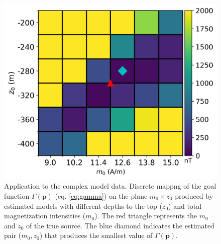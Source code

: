 \begin{figure}
	\centering
	\includegraphics[scale=.75]{figures/complex_gamma.png}
	\caption{Application to the complex model data. 
	Discrete mappng of the goal function $\Gamma(\mathbf{p})$ (eq. \ref{eq:gamma}) on the plane $ m_0 \times z_0 $ produced by estimated models with different depths-to-the-top ($ z_0 $) and 
	total-magnetization intensities ($ m_0 $). 
	The red triangle represents the $m_0$ and $z_0$ of the true source. 
	The blue diamond indicates the estimated pair ($ m_0, z_0 $) that produces the smallest value of $\Gamma (\mathbf{p})$.}
	\label{fig:complex_map}
\end{figure}

